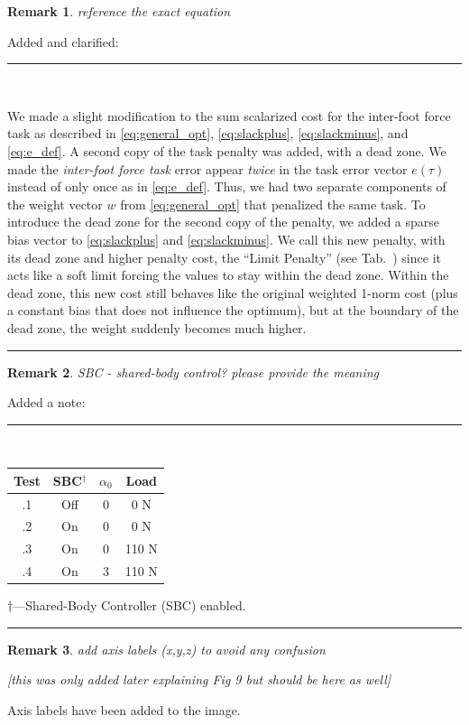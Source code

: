 \documentclass[10pt,letterpaper]{letter}
\renewcommand*{\ref}[1]{\zref{#1}}
\newcommand*{\ta}[1]{\textcolor[HTML]{107f10}{#1}}
\newcounter{reviewer}
\newtheorem{rev}{Remark}[reviewer]
\newcommand{\reviewer}[1]{\begin{rev} #1\end{rev}}
\newcommand{\response}[1]{\par{\hfill\begin{minipage}{\dimexpr\textwidth-2cm} #1\end{minipage}}}
\newcommand{\paperquote}[1]{%
	\begin{center}
		
		\begin{minipage}{.8\textwidth}
			{\rule{\textwidth}{.5pt}}\vspace{.5em}\\
			\begin{minipage}{\textwidth}\setlength{\parindent}{2em}#1\end{minipage}
			\vspace{.5em}
			{\rule{\textwidth}{.5pt}}
		\end{minipage}%
	\end{center}
}
\begin{document}
\begin{letter}{}
\reviewer{reference the exact equation}
\response{Added and clarified:}
\paperquote{
We made a slight modification to the sum scalarized cost for the \ta{inter-foot force task} \ta{as described in \eqref{eq:general_opt}, \eqref{eq:slackplus}, \eqref{eq:slackminus}, and \eqref{eq:e_def}}. \ta{A second copy of the task penalty was added, with a dead zone. We made the \emph{inter-foot force task} error appear \emph{twice} in the task error vector $e(\tau)$ instead of only once as in \eqref{eq:e_def}. Thus, we had two separate components of the weight vector $w$ from \eqref{eq:general_opt} that penalized the same task. To introduce the dead zone for the second copy of the penalty, we added a sparse bias vector to \eqref{eq:slackplus} and \eqref{eq:slackminus}. We call this new penalty, with its dead zone and higher penalty cost, the ``Limit Penalty'' (see Tab.~\ref{tab:priorities}) since it acts like a soft limit forcing the values to stay within the dead zone.} \ta{Within the dead zone, this new cost still behaves like the original weighted 1-norm cost (plus a constant bias that does not influence the optimum), but at the boundary of the dead zone, the weight suddenly becomes much higher.}
}

\reviewer{SBC - shared-body control? please provide the meaning}
\response{Added a note:}
\paperquote{\begin{minipage}{2in}\centering
		\begin{tabular}{cccc}
			\toprule
			Test & SBC\ta{$^\dagger$} & $\alpha_0$ & Load\\
			\midrule
			\ref{subs:amp}.1 & Off & 0 & 0 N\\
			\ref{subs:amp}.2 & On & 0 & 0 N\\
			\ref{subs:amp}.3 & On & 0 & 110 N\\
			\ref{subs:amp}.4 & On & 3 & 110 N\\
			\bottomrule
		\end{tabular}
		\vspace{.5em}
		
		\ta{\scriptsize$\dagger$---Shared-Body Controller (SBC) enabled.}
		
	\end{minipage}}


\reviewer{add axis labels (x,y,z) to avoid any confusion
	
	[this was only added later explaining Fig 9 but should be here as well]}

\response{Axis labels have been added to the image.}


\end{letter}
\end{document}

